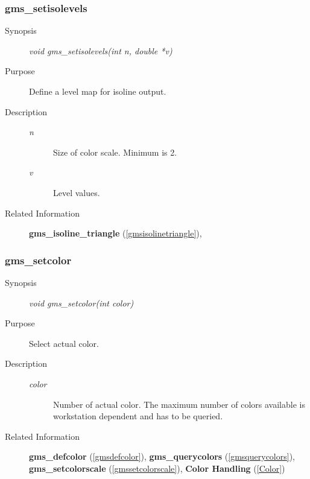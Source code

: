 \subsubsection{gms\_setisolevels\label{gmssetisolevels}}
\begin{description}
\item[Synopsis]\mbox{}


{\em void    gms\_setisolevels(int n, 
double *v)\/}
\item[Purpose]\mbox{}


Define a level map for isoline output.
\item[Description]\mbox{}


\begin{description}
\item[{\em n\/}]\mbox{}

 Size of color scale. Minimum is 2. 
\item[{\em v\/}]\mbox{}

 Level values.
\end{description}

\item[Related Information]\mbox{}


{\bf gms\_isoline\_triangle} (\ref{gmsisolinetriangle}), 
\end{description}



\newpage



\subsubsection{gms\_setcolor\label{gmssetcolor}}
\begin{description}
\item[Synopsis]\mbox{}


{\em void    gms\_setcolor(int color)\/}
\item[Purpose]\mbox{}


Select actual color.
\item[Description]\mbox{}


\begin{description}
\item[{\em color\/}]\mbox{}

 Number of actual color. 
The maximum number of colors available is
workstation dependent and has to be queried.
\end{description}

\item[Related Information]\mbox{}


{\bf gms\_defcolor} (\ref{gmsdefcolor}), 
{\bf gms\_querycolors} (\ref{gmsquerycolors}), 
{\bf gms\_setcolorscale} (\ref{gmssetcolorscale}), 
{\bf Color Handling} (\ref{Color})
\end{description}



